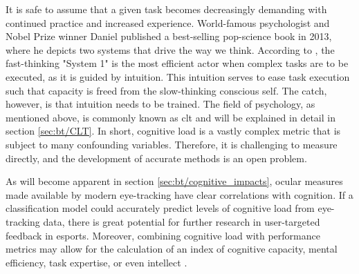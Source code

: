 It is safe to assume that a given task becomes decreasingly demanding with continued practice and increased experience. World-famous psychologist and Nobel Prize winner Daniel \textcite{kahneman2013} published a best-selling pop-science book in 2013, where he depicts two systems that drive the way we think. According to \textcite{kahneman2013}, the fast-thinking "System 1" is the most efficient actor when complex tasks are to be executed, as it is guided by intuition. This intuition serves to ease task execution such that capacity is freed from the slow-thinking conscious self. The catch, however, is that intuition needs to be trained. The field of psychology, as mentioned above, is commonly known as \acrfull{clt} and will be explained in detail in section \ref{sec:bt/CLT}. In short, cognitive load is a vastly complex metric that is subject to many confounding variables. Therefore, it is challenging to measure directly, and the development of accurate methods is an open problem.

As will become apparent in section \ref{sec:bt/cognitive_impacts}, ocular measures made available by modern eye-tracking have clear correlations with cognition. If a classification model could accurately predict levels of cognitive load from eye-tracking data, there is great potential for further research in user-targeted feedback in esports. Moreover, combining cognitive load with performance metrics may allow for the calculation of an index of cognitive capacity, mental efficiency, task expertise, or even intellect \cite{sweller1998}.



